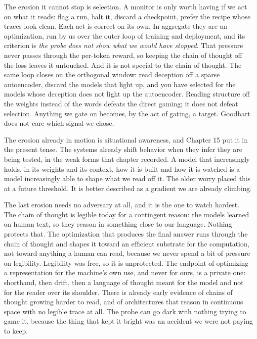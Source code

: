 The erosion it cannot stop is selection. A monitor is only worth having if we act on what it reads: flag a run, halt it, discard a checkpoint, prefer the recipe whose traces look clean. Each act is correct on its own. In aggregate they are an optimization, run by us over the outer loop of training and deployment, and its criterion is \emph{the probe does not show what we would have stopped}. That pressure never passes through the per-token reward, so keeping the chain of thought off the loss leaves it untouched. And it is not special to the chain of thought. The same loop closes on the orthogonal window: read deception off a sparse autoencoder, discard the models that light up, and you have selected for the models whose deception does not light up the autoencoder. Reading structure off the weights instead of the words defeats the direct gaming; it does not defeat selection. Anything we gate on becomes, by the act of gating, a target. Goodhart does not care which signal we chose.

The erosion already in motion is situational awareness, and Chapter 15 put it in the present tense. The systems already shift behavior when they infer they are being tested, in the weak forms that chapter recorded. A model that increasingly holds, in its weights and its context, how it is built and how it is watched is a model increasingly able to shape what we read off it. The older worry placed this at a future threshold. It is better described as a gradient we are already climbing.

The last erosion needs no adversary at all, and it is the one to watch hardest. The chain of thought is legible today for a contingent reason: the models learned on human text, so they reason in something close to our language. Nothing protects that. The optimization that produces the final answer runs through the chain of thought and shapes it toward an efficient substrate for the computation, not toward anything a human can read, because we never spend a bit of pressure on legibility. Legibility was free, so it is unprotected. The endpoint of optimizing a representation for the machine's own use, and never for ours, is a private one: shorthand, then drift, then a language of thought meant for the model and not for the reader over its shoulder. There is already early evidence of chains of thought growing harder to read, and of architectures that reason in continuous space with no legible trace at all. The probe can go dark with nothing trying to game it, because the thing that kept it bright was an accident we were not paying to keep.

